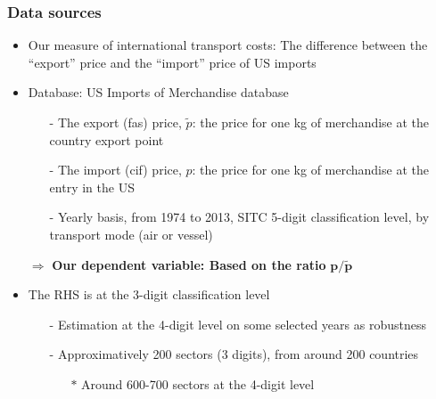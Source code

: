\documentclass[10 pt,Helvetica, french]{beamer}
\begin{document}
\begin{frame} [label=slide_data]
\frametitle{Data sources}
\begin{itemize}
\item Our measure of international transport costs: The difference between the ``export'' price and the ``import'' price of US imports\vspace{0.1cm}
\item Database: US Imports of Merchandise database \vspace{0.1cm}
\pause
\begin{itemize}
\item[-] The export (fas) price, $\widetilde{p}$: the price for one kg of merchandise at the country export point \vspace{0.1cm}
\item[-] The import (cif) price, $p$: the price for one kg of merchandise at the entry in the US \vspace{0.1cm}
\item[-] Yearly basis, from 1974 to 2013, SITC 5-digit classification level, by transport mode (air or vessel) \vspace{0.1cm}

\pause
\end{itemize}
\item[$\Rightarrow$] \textbf{Our dependent variable: Based on the ratio} $\mathbf{p/\widetilde{p}}$ \vspace{0.1cm}

\pause 

\item The RHS is at the 3-digit classification level  \vspace{0.1cm}
\begin{itemize}
\item[-] Estimation at the 4-digit level on some selected years as robustness \vspace{0.1cm}
\item[-] Approximatively 200 sectors (3 digits), from around 200 countries  \vspace{0.1cm}
\begin{itemize}
\item[$\ast$] Around 600-700 sectors at the 4-digit level
\end{itemize}
\end{itemize}
\end{itemize}
\end{frame}
\end{document}
